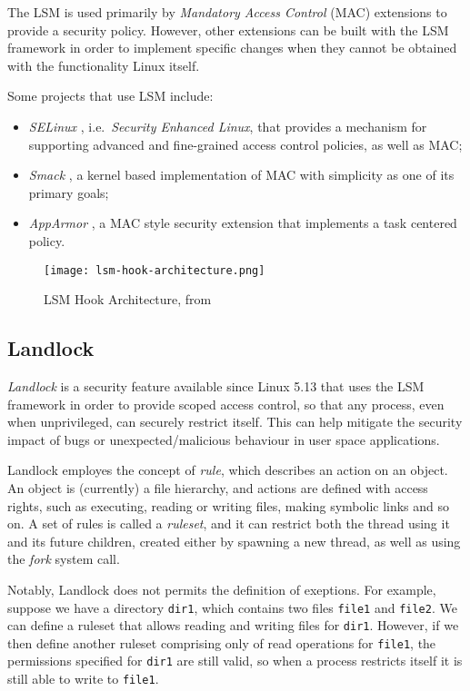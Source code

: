 The LSM is used primarily by \textit{Mandatory Access Control} (MAC) extensions to
provide a security policy. However, other extensions can be built with the LSM framework
in order to implement specific changes when they cannot be obtained with the functionality Linux itself.

Some projects that use LSM include:
\begin{itemize}
  \item \textit{SELinux} \cite{selinux}, i.e.\ \textit{Security Enhanced Linux}, that provides a mechanism for supporting advanced and fine-grained access control policies, as well as MAC;
  \item \textit{Smack} \cite{smack}, a kernel based implementation of MAC with simplicity as one of its primary goals;
  \item \textit{AppArmor} \cite{apparmor}, a MAC style security extension that implements a task centered policy.
\end{itemize}

\begin{figure}[h]
  \centering
  \texttt{[image: lsm-hook-architecture.png]}
  \caption{LSM Hook Architecture, from \cite{kernel-lsm}}
  \label{fig:lsm-hook-architecture}
\end{figure}

\subsection{Landlock}
\textit{Landlock} \cite{landlock-kernel} \cite{landlock-user-space} is a security feature available since Linux 5.13
that uses the LSM framework in order to provide scoped access control,
so that any process, even when unprivileged, can securely restrict itself.
This can help mitigate the security impact of bugs or unexpected/malicious behaviour
in user space applications.

Landlock employes the concept of \textit{rule}, which describes an action
on an object. An object is (currently) a file hierarchy, and actions are
defined with access rights, such as executing, reading or writing files, making
symbolic links and so on.
A set of rules is called a \textit{ruleset}, and it can restrict both the thread
using it and its future children, created either by spawning a new thread, as well
as using the \textit{fork} system call.

Notably, Landlock does not permits the definition of exeptions.
For example, suppose we have a directory \texttt{dir1}, which contains two files
\texttt{file1} and \texttt{file2}. We can define a ruleset that allows
reading and writing files for \texttt{dir1}.
However, if we then define another ruleset comprising only of read operations
for \texttt{file1}, the permissions specified for \texttt{dir1} are still
valid, so when a process restricts itself it is still able to write to \texttt{file1}.

